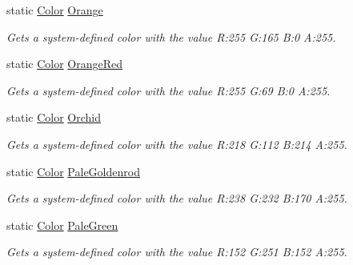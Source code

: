 \begin{DoxyCompactItemize}
static \hyperlink{struct_microsoft_1_1_xna_1_1_framework_1_1_color}{Color} \hyperlink{struct_microsoft_1_1_xna_1_1_framework_1_1_color_a891dbee2b9fed788066f447618cc55d5}{Orange}
\begin{DoxyCompactList}\small\item\em Gets a system-\/defined color with the value R\+:255 G\+:165 B\+:0 A\+:255.\end{DoxyCompactList}\item 
static \hyperlink{struct_microsoft_1_1_xna_1_1_framework_1_1_color}{Color} \hyperlink{struct_microsoft_1_1_xna_1_1_framework_1_1_color_af24e501281a78bef15f3d8348202735c}{Orange\+Red}
\begin{DoxyCompactList}\small\item\em Gets a system-\/defined color with the value R\+:255 G\+:69 B\+:0 A\+:255.\end{DoxyCompactList}\item 
static \hyperlink{struct_microsoft_1_1_xna_1_1_framework_1_1_color}{Color} \hyperlink{struct_microsoft_1_1_xna_1_1_framework_1_1_color_a08aa26c9ad02eaf6158a41a1afe9652b}{Orchid}
\begin{DoxyCompactList}\small\item\em Gets a system-\/defined color with the value R\+:218 G\+:112 B\+:214 A\+:255.\end{DoxyCompactList}\item 
static \hyperlink{struct_microsoft_1_1_xna_1_1_framework_1_1_color}{Color} \hyperlink{struct_microsoft_1_1_xna_1_1_framework_1_1_color_a828970172f983fc3af0ecbf368943212}{Pale\+Goldenrod}
\begin{DoxyCompactList}\small\item\em Gets a system-\/defined color with the value R\+:238 G\+:232 B\+:170 A\+:255.\end{DoxyCompactList}\item 
static \hyperlink{struct_microsoft_1_1_xna_1_1_framework_1_1_color}{Color} \hyperlink{struct_microsoft_1_1_xna_1_1_framework_1_1_color_a15e7a404d07856e9cecb66ef2dcb0e75}{Pale\+Green}
\begin{DoxyCompactList}\small\item\em Gets a system-\/defined color with the value R\+:152 G\+:251 B\+:152 A\+:255.\end{DoxyCompactList}\item 

\end{DoxyCompactItemize}
